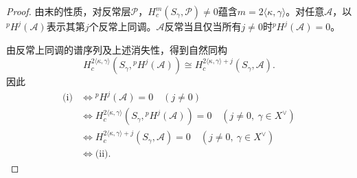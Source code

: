 \begin{proof}
由末的性质，对反常层$\mathcal P$，$H_c^m(S_\gamma,\mathcal P)\ne0$蕴含$m=2\langle\kappa,\gamma\rangle$。对任意$\mathcal A$，以${}^pH^j(\mathcal A)$表示其第$j$个反常上同调。$\mathcal A$反常当且仅当所有$j\ne0$时${}^pH^j(\mathcal A)=0$。

由反常上同调的谱序列及上述消失性，得到自然同构
\[H_c^{2\langle\kappa,\gamma\rangle}(S_\gamma,{}^pH^j(\mathcal A))\cong H_c^{2\langle\kappa,\gamma\rangle+j}(S_\gamma,\mathcal A).\]
因此
\begin{align*}
\text{(i)}&\Longleftrightarrow{}^pH^j(\mathcal A)=0\quad(j\ne0)\\
&\Longleftrightarrow H_c^{2\langle\kappa,\gamma\rangle}(S_\gamma,{}^pH^j(\mathcal A))=0\quad(j\ne0,\ \gamma\in X^\vee)\\
&\Longleftrightarrow H_c^{2\langle\kappa,\gamma\rangle+j}(S_\gamma,\mathcal A)=0\quad(j\ne0,\ \gamma\in X^\vee)\\
&\Longleftrightarrow\text{(ii)}.
\end{align*}
\end{proof}

